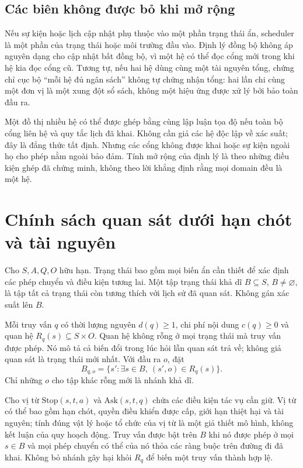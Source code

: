 \subsection{Các biên không được bỏ khi mở rộng}
Nếu sự kiện hoặc lịch cập nhật phụ thuộc vào một phần trạng thái ẩn, scheduler là một phần của trạng thái hoặc môi trường đầu vào. Định lý đồng bộ không áp nguyên dạng cho cập nhật bất đồng bộ, vì một hệ có thể đọc cổng mới trong khi hệ kia đọc cổng cũ. Tương tự, nếu hai hệ dùng cùng một tài nguyên tổng, chứng chỉ cục bộ ``mỗi hệ đủ ngân sách'' không tự chứng nhận tổng: hai lần chi cùng một đơn vị là một xung đột sổ sách, không một hiệu ứng được xử lý bởi bảo toàn đầu ra.

Một đồ thị nhiều hệ có thể được ghép bằng cùng lập luận tọa độ nếu toàn bộ cổng liên hệ và quy tắc lịch đã khai. Không cần giả các hệ độc lập về xác suất; đây là đẳng thức tất định. Nhưng các cổng không được khai hoặc sự kiện ngoài họ cho phép nằm ngoài bảo đảm. Tính mở rộng của định lý là theo những điều kiện ghép đã chứng minh, không theo lời khẳng định rằng mọi domain đều là một hệ.

\section{Chính sách quan sát dưới hạn chót và tài nguyên}\label{sec:policies}
Cho $S,A,Q,O$ hữu hạn. Trạng thái bao gồm mọi biến ẩn cần thiết để xác định các phép chuyển và điều kiện tương lai. Một tập trạng thái khả dĩ $B\subseteq S$, $B\ne\varnothing$, là tập tất cả trạng thái còn tương thích với lịch sử đã quan sát. Không gán xác suất lên $B$.

Mỗi truy vấn $q$ có thời lượng nguyên $d(q)\ge1$, chi phí nội dung $c(q)\ge0$ và quan hệ $R_q(s)\subseteq S\times O$. Quan hệ không rỗng ở mọi trạng thái mà truy vấn được phép. Nó mô tả cả biến đổi trong lúc hỏi lẫn quan sát trả về; không giả quan sát là trạng thái mới nhất. Với đầu ra $o$, đặt
\begin{equation}\label{eq:belief}
B_{q,o}=\{s':\exists s\in B,\ (s',o)\in R_q(s)\}.
\end{equation}
Chỉ những $o$ cho tập khác rỗng mới là nhánh khả dĩ.

Cho vị từ $\mathrm{Stop}(s,t,a)$ và $\mathrm{Ask}(s,t,q)$ chứa các điều kiện tác vụ cần giữ. Vị từ có thể bao gồm hạn chót, quyền điều khiển được cấp, giới hạn thiệt hại và tài nguyên; tính đúng vật lý hoặc tổ chức của vị từ là một giả thiết mô hình, không kết luận của quy hoạch động. Truy vấn được bật trên $B$ khi nó được phép ở mọi $s\in B$ và mọi phép chuyển có thể của nó thỏa các ràng buộc trên đường đi đã khai. Không bỏ nhánh gây hại khỏi $R_q$ để biến một truy vấn thành hợp lệ.

